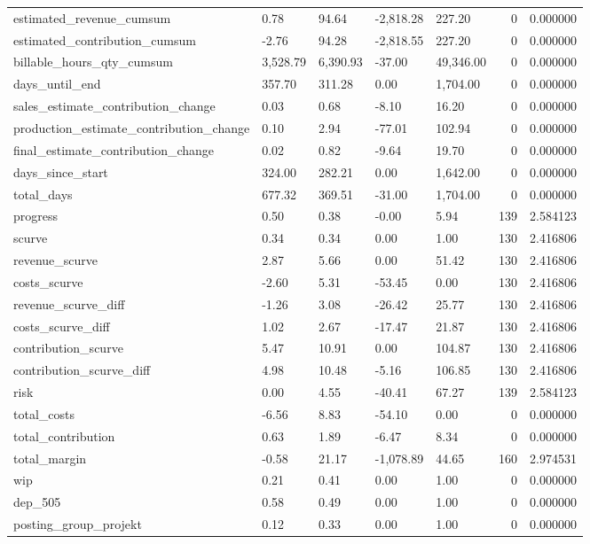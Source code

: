 \begin{longtable}{lllllrr}
estimated_revenue_cumsum & 0.78 & 94.64 & -2,818.28 & 227.20 & 0 & 0.000000 \\
estimated_contribution_cumsum & -2.76 & 94.28 & -2,818.55 & 227.20 & 0 & 0.000000 \\
billable_hours_qty_cumsum & 3,528.79 & 6,390.93 & -37.00 & 49,346.00 & 0 & 0.000000 \\
days_until_end & 357.70 & 311.28 & 0.00 & 1,704.00 & 0 & 0.000000 \\
sales_estimate_contribution_change & 0.03 & 0.68 & -8.10 & 16.20 & 0 & 0.000000 \\
production_estimate_contribution_change & 0.10 & 2.94 & -77.01 & 102.94 & 0 & 0.000000 \\
final_estimate_contribution_change & 0.02 & 0.82 & -9.64 & 19.70 & 0 & 0.000000 \\
days_since_start & 324.00 & 282.21 & 0.00 & 1,642.00 & 0 & 0.000000 \\
total_days & 677.32 & 369.51 & -31.00 & 1,704.00 & 0 & 0.000000 \\
progress & 0.50 & 0.38 & -0.00 & 5.94 & 139 & 2.584123 \\
scurve & 0.34 & 0.34 & 0.00 & 1.00 & 130 & 2.416806 \\
revenue_scurve & 2.87 & 5.66 & 0.00 & 51.42 & 130 & 2.416806 \\
costs_scurve & -2.60 & 5.31 & -53.45 & 0.00 & 130 & 2.416806 \\
revenue_scurve_diff & -1.26 & 3.08 & -26.42 & 25.77 & 130 & 2.416806 \\
costs_scurve_diff & 1.02 & 2.67 & -17.47 & 21.87 & 130 & 2.416806 \\
contribution_scurve & 5.47 & 10.91 & 0.00 & 104.87 & 130 & 2.416806 \\
contribution_scurve_diff & 4.98 & 10.48 & -5.16 & 106.85 & 130 & 2.416806 \\
risk & 0.00 & 4.55 & -40.41 & 67.27 & 139 & 2.584123 \\
total_costs & -6.56 & 8.83 & -54.10 & 0.00 & 0 & 0.000000 \\
total_contribution & 0.63 & 1.89 & -6.47 & 8.34 & 0 & 0.000000 \\
total_margin & -0.58 & 21.17 & -1,078.89 & 44.65 & 160 & 2.974531 \\
wip & 0.21 & 0.41 & 0.00 & 1.00 & 0 & 0.000000 \\
dep_505 & 0.58 & 0.49 & 0.00 & 1.00 & 0 & 0.000000 \\
posting_group_projekt & 0.12 & 0.33 & 0.00 & 1.00 & 0 & 0.000000 \\

\end{longtable}
